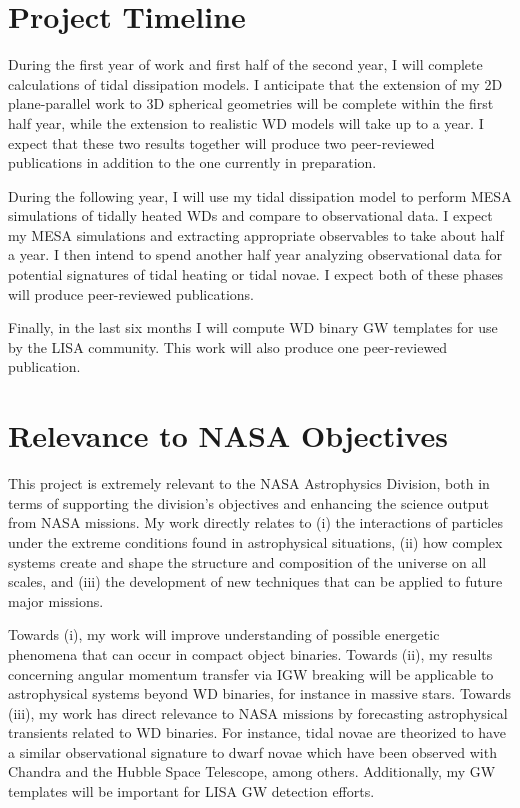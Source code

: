 \documentclass[12pt,
        usenames, %
        dvipsnames %
    ]{article}
\begin{document}
\section{Project Timeline}

During the first year of work and first half of the second year, I will complete
calculations of tidal dissipation models. I anticipate that the extension of my
2D plane-parallel work to 3D spherical geometries will be complete within the
first half year, while the extension to realistic WD models will take up to a
year. I expect that these two results together will produce two peer-reviewed
publications in addition to the one currently in preparation.

During the following year, I will use my tidal dissipation model to perform MESA
simulations of tidally heated WDs and compare to observational data. I expect my
MESA simulations and extracting appropriate observables to take about half a
year. I then intend to spend another half year analyzing observational data for
potential signatures of tidal heating or tidal novae. I expect both of these
phases will produce peer-reviewed publications.

Finally, in the last six months I will compute WD binary GW templates for use by
the LISA community. This work will also produce one peer-reviewed publication.

\section{Relevance to NASA Objectives}

This project is extremely relevant to the NASA Astrophysics Division, both in
terms of supporting the division's objectives and enhancing the science output
from NASA missions. My work directly relates to (i) the interactions of
particles under the extreme conditions found in astrophysical situations, (ii)
how complex systems create and shape the structure and composition of the
universe on all scales, and (iii) the development of new techniques that can be
applied to future major missions.

Towards (i), my work will improve understanding of possible energetic phenomena
that can occur in compact object binaries. Towards (ii), my results concerning
angular momentum transfer via IGW breaking will be applicable to astrophysical
systems beyond WD binaries, for instance in massive stars\cite{l_trans_rev}.
Towards (iii), my work has direct relevance to NASA missions by forecasting
astrophysical transients related to WD binaries. For instance, tidal novae are
theorized to have a similar observational signature to dwarf novae which have
been observed with Chandra and the Hubble Space Telescope, among others.
Additionally, my GW templates will be important for LISA GW detection efforts.

\clearpage

\printbibliography
\end{document}
